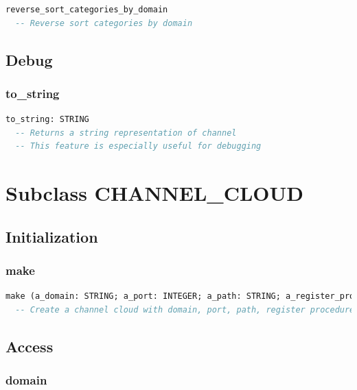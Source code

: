 \begin{lstlisting}[language=Eiffel]
reverse_sort_categories_by_domain
  -- Reverse sort categories by domain
\end{lstlisting}


\subsection{Debug}
\label{sec:channel-debug}

\subsubsection{to\_string}

\begin{lstlisting}[language=Eiffel]
to_string: STRING
  -- Returns a string representation of channel
  -- This feature is especially useful for debugging
\end{lstlisting}


\section{Subclass CHANNEL\_CLOUD}
\label{sec:channel-cloud}

\subsection{Initialization}
\label{sec:channel-cloud-initialization}

\subsubsection{make}

\begin{lstlisting}[language=Eiffel]
make (a_domain: STRING; a_port: INTEGER; a_path: STRING; a_register_procedure: STRING; a_protocol: STRING)
  -- Create a channel cloud with domain, port, path, register procedure and protocol
\end{lstlisting}

\subsection{Access}
\label{sec:channel-cloud-access}

\subsubsection{domain}

